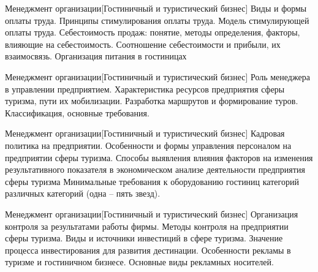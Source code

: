 \documentclass[
	11pt,
	a4paper,
	]
	{article}
\begin{document}
\vfill



\begin{minipage}[t][\miniH]{\miniL}\centering
	 {Менеджмент организации}[Гостиничный и туристический бизнес]
		{
			Виды и формы оплаты труда. Принципы стимулирования оплаты труда. Модель стимулирующей оплаты труда.
		}{
			Себестоимость продаж: понятие, методы определения, факторы, влияющие на себестоимость. Соотношение себестоимости и прибыли, их взаимосвязь.
		}{
			Организация питания в гостиницах
		}
	\lowGE
\end{minipage}





\begin{minipage}[t][\miniH]{\miniL}\centering
	 {Менеджмент организации}[Гостиничный и туристический бизнес]
		{
			Роль менеджера в управлении предприятием.
		}{
			Характеристика ресурсов предприятия сферы туризма, пути их мобилизации.
		}{
			Разработка маршрутов и формирование туров. Классификация, основные требования.
		}
	\lowGE
\end{minipage}

\vfill



\begin{minipage}[t][\miniH]{\miniL}\centering
	 {Менеджмент организации}[Гостиничный и туристический бизнес]
		{
			Кадровая политика на предприятии. Особенности и формы управления персоналом на предприятии сферы туризма.
		}{
			Способы выявления влияния факторов на изменения результативного показателя в экономическом анализе деятельности предприятия сферы туризма
		}{
			Минимальные требования к оборудованию гостиниц категорий различных категорий (одна – пять звезд).
		}
	\lowGE
\end{minipage}

\vfill



\begin{minipage}[t][\miniH]{\miniL}\centering
	 {Менеджмент организации}[Гостиничный и туристический бизнес]
		{
			Организация контроля за результатами работы фирмы. Методы контроля на предприятии сферы туризма.
		}{
			Виды и источники инвестиций в сфере туризма. Значение процесса инвестирования для развития дестинации.
		}{
			Особенности рекламы в туризме и гостиничном бизнесе. Основные виды рекламных носителей.
		}
	\lowGE
\end{minipage}
\end{document}
